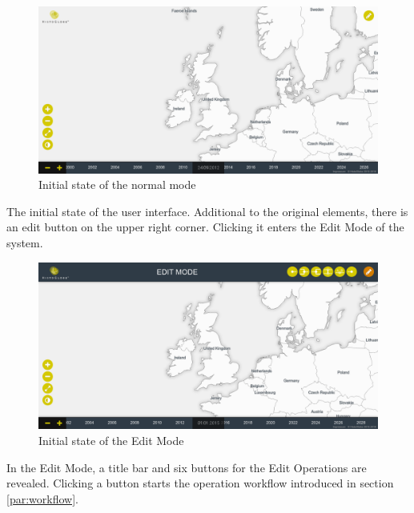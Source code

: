 \newpage
\begin{minipage}[t]{0.47\textwidth}

  \begin{figure}[H]
    \centering
    \includegraphics[width=1.0\textwidth]{graphics/development/final_interface/1_init.png}
    \caption{Initial state of the normal mode}
    \label{fig:final_1_init}
  \end{figure}

  The initial state of the user interface. Additional to the original elements, there is an edit button on the upper right corner. Clicking it enters the Edit Mode of the system.

\end{minipage}    %
\hspace{1.5em}    %
\begin{minipage}[t]{0.47\textwidth}

  \begin{figure}[H]
    \centering
    \includegraphics[width=1.0\textwidth]{graphics/development/final_interface/2_edit_mode.png}
    \caption{Initial state of the Edit Mode}
    \label{fig:final_2_edit_mode}
  \end{figure}

  In the Edit Mode, a title bar and six buttons for the Edit Operations are   revealed. Clicking a button starts the operation workflow introduced in section \ref{par:workflow}.

\end{minipage}

